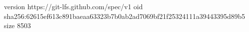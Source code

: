 version https://git-lfs.github.com/spec/v1
oid sha256:62615ef613c891baeaa63323b7b0ab2ad7069bf21f25324111a39443395d89b5
size 8503
